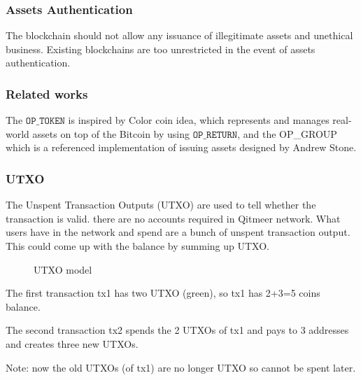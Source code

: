 \documentclass[a4paper,11pt]{article}
\begin{document}
\subsubsection*{Assets Authentication}
The blockchain should not allow any issuance of illegitimate assets and unethical business. Existing blockchains are too unrestricted in the event of assets authentication.

\subsubsection{Related works}

The $\texttt{OP\_TOKEN}$ is inspired by Color coin idea, which represents and manages real-world assets on top of the Bitcoin by using $\texttt{OP\_RETURN}$, and the OP\_GROUP which is a referenced implementation of issuing assets designed by Andrew Stone.

\subsubsection*{UTXO}

The Unspent Transaction Outputs (UTXO) are used to tell whether the transaction is valid. there are no accounts required in Qitmeer network. What users have in the network and spend are a bunch of unspent transaction output. This could come up with the balance by summing up UTXO.

\begin{figure}[hbt]
	\centerline{%
	}
\caption{UTXO model}
\end{figure}

The first transaction tx1 has two UTXO (green), so tx1 has 2+3=5 coins balance.

The second transaction tx2 spends the 2 UTXOs of tx1 and pays to 3 addresses and creates three new UTXOs.

Note: now the old UTXOs (of tx1) are no longer UTXO so cannot be spent later.
\end{document}
